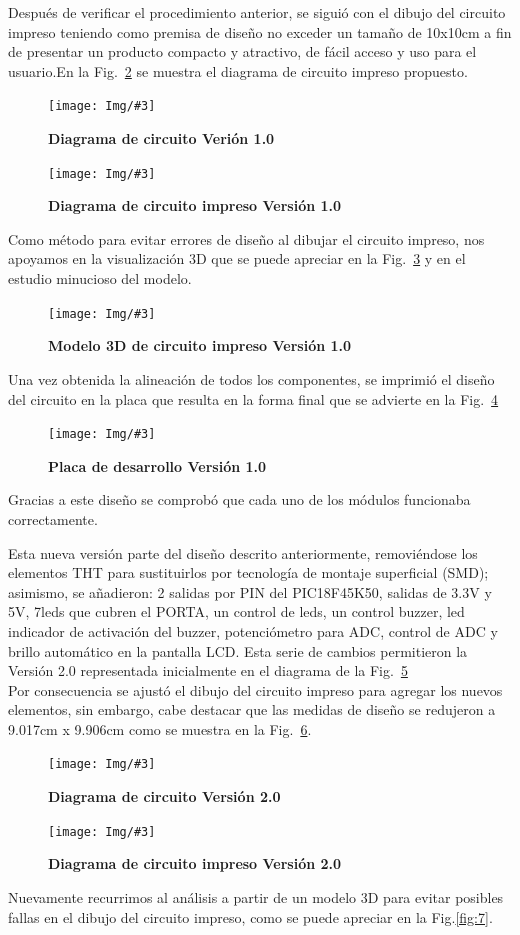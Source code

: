 \documentclass[times, 10pt,twocolumn]{article}
\newcommand{\Img}[5]{
   \begin{figure}[H]
   	   \centering
       \texttt{[image: Img/\#3]}
       \caption{ \centering \textbf{\small #4}}
       \label{#5}
       \end{figure}
   }
\begin{document}
Después de verificar el procedimiento anterior, se siguió con el dibujo del circuito impreso teniendo como premisa de diseño no exceder un tamaño de 10x10cm a fin de presentar un producto compacto y atractivo, de fácil acceso y uso para el usuario.En la Fig.~\ref{fig:2} se muestra el diagrama de circuito impreso propuesto.

\Img{8.5cm}{6.3cm}{Primera_Version.pdf}{Diagrama de circuito Verión 1.0}{fig:1} 

\Img{6.5cm}{6.0cm}{primera_version_pcb}{Diagrama de circuito impreso Versión 1.0}{fig:2}
Como método para evitar errores de diseño al dibujar el circuito impreso, nos apoyamos en la visualización 3D que se puede apreciar en la Fig.~\ref{fig:3} y en el estudio minucioso del modelo.
\Img{8.5cm}{7.0cm}{primera_version_3d}{Modelo 3D de circuito impreso Versión 1.0}{fig:3}
Una vez obtenida la alineación de todos los componentes, se imprimió el diseño del circuito en la placa que resulta en la forma final que se advierte en la Fig.~\ref{fig:4}
\Img{8.5cm}{7.0cm}{primera_version_final}{Placa de desarrollo Versión 1.0}{fig:4} 
Gracias a este diseño se comprobó que cada uno de los módulos funcionaba correctamente. 


Esta nueva versión parte del diseño descrito anteriormente, removiéndose los elementos THT para sustituirlos por tecnología de montaje superficial (SMD); asimismo, se añadieron: 2 salidas por PIN del PIC18F45K50, salidas de 3.3V y 5V, 7leds que cubren el PORTA, un control de leds, un control buzzer, led indicador de activación del buzzer, potenciómetro para ADC, control de ADC y brillo automático en la pantalla LCD. Esta serie de cambios permitieron la Versión 2.0 representada inicialmente en el diagrama de la Fig.~\ref{fig:5}\\

Por consecuencia se ajustó el dibujo del circuito impreso para agregar los nuevos elementos, sin embargo, cabe destacar que las medidas de diseño se redujeron a 9.017cm x 9.906cm como se muestra en la Fig.~\ref{fig:6}. 
\Img{8.0cm}{5.5cm}{Segunda_Version}{Diagrama de circuito Versión 2.0}{fig:5}

\Img{6.5cm}{6.0cm}{segunda_version_pcb}{Diagrama de circuito impreso Versión 2.0}{fig:6}


Nuevamente recurrimos al análisis a partir de un modelo 3D para evitar posibles fallas en el dibujo del circuito impreso, como se puede apreciar en la Fig.\ref{fig:7}.
\end{document}
